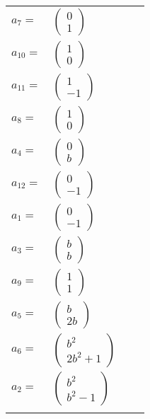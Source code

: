 \documentclass[1p]{elsarticle_modified}
\theoremstyle{definition}
\begin{document}
\begin{tabular}{m{7pt} m{180pt} m{7pt} m{180pt} }
\flushright $a_{7}=$&$\begin{pmatrix}0\\1\end{pmatrix}$ \\
\flushright $a_{10}=$&$\begin{pmatrix}1\\0\end{pmatrix}$ \\
\flushright $a_{11}=$&$\begin{pmatrix}1\\-1\end{pmatrix}$ \\
\flushright $a_{8}=$&$\begin{pmatrix}1\\0\end{pmatrix}$ \\
\flushright $a_{4}=$&$\begin{pmatrix}0\\b\end{pmatrix}$ \\
\flushright $a_{12}=$&$\begin{pmatrix}0\\-1\end{pmatrix}$ \\
\flushright $a_{1}=$&$\begin{pmatrix}0\\-1\end{pmatrix}$ \\
\flushright $a_{3}=$&$\begin{pmatrix}b\\b\end{pmatrix}$ \\
\flushright $a_{9}=$&$\begin{pmatrix}1\\1\end{pmatrix}$ \\
\flushright $a_{5}=$&$\begin{pmatrix}b\\2 b\end{pmatrix}$ \\
\flushright $a_{6}=$&$\begin{pmatrix}b^2\\2 b^2+1\end{pmatrix}$ \\
\flushright $a_{2}=$&$\begin{pmatrix}b^2\\b^2-1\end{pmatrix}$\\&\end{tabular}
\end{document}
